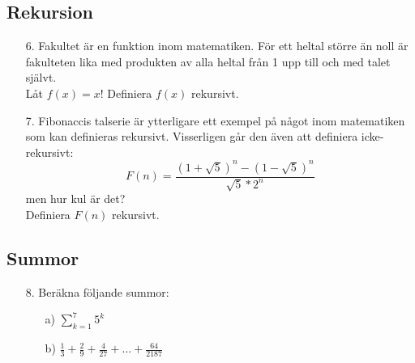 \documentclass{article}
\begin{document}
\subsection*{Rekursion}
\begin{enumerate}

\item[6.]
Fakultet är en funktion inom matematiken. För ett heltal större än noll är fakulteten 
lika med produkten av alla heltal från 1 upp till och med talet självt.\\

Låt $f(x)=x!$ Definiera $f(x)$ rekursivt.

\item[7.]
Fibonaccis talserie är ytterligare ett exempel på något inom matematiken som kan definieras rekursivt.
Visserligen går den även att definiera icke-rekursivt:
\[F(n)=\frac{(1+\sqrt{5})^n-(1-\sqrt{5})^n}{\sqrt{5}*2^n}\]
men hur kul är det? \\

Definiera $F(n)$ rekursivt.

\end{enumerate}

\subsection*{Summor}
\begin{enumerate}
\item[8.]
Beräkna följande summor: 
\begin{itemize}
\item[a)] $\sum\limits_{k=1}^{7} 5^k$
\item[b)] $\frac{1}{3}+\frac{2}{9}+\frac{4}{27}+...+\frac{64}{2187}$
\end{itemize}
\end{enumerate}
\end{document}
